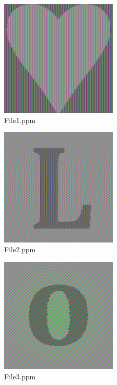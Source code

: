 \documentclass{article}
\begin{document}
\begin{figure}
    \centering
    \includegraphics[width=0.5\textwidth]{images/File1.png}
    \caption{File1.ppm}
\end{figure}

\begin{figure}
    \centering
    \includegraphics[width=0.5\textwidth]{images/File2.png}
    \caption{File2.ppm}
\end{figure}

\begin{figure}
    \centering
    \includegraphics[width=0.5\textwidth]{images/File3.png}
    \caption{File3.ppm}
\end{figure}
\end{document}
